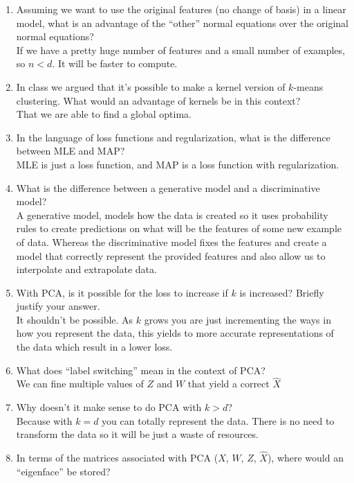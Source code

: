 \documentclass{article}
\def\ans#1{{\color{ans}#1}}
\def\enum#1{\begin{enumerate}#1\end{enumerate}}
\begin{document}
\enum{
\item Assuming we want to use the original features (no change of basis) in a linear model, what is an advantage of the ``other'' normal equations over the original normal equations?  \\
\ans{
    If we have a pretty huge number of features and a small number of examples, so $n < d$. 
    It will be faster to compute.
}
\item In class we argued that it's possible to make a kernel version of $k$-means clustering. What would an advantage of kernels be in this context?  \\
\ans{
    That we are able to find a global optima.
}
\item In the language of loss functions and regularization, what is the difference between MLE and MAP?  \\
\ans{
    MLE is just a loss function, and MAP is a loss function with regularization.
}
\item What is the difference between a generative model and a discriminative model?  \\
\ans{
    A generative model, models how the data is created so it uses probability rules to create predictions 
    on what will be the features of some new example of data. Whereas the discriminative model fixes 
    the features and create a model that correctly represent the provided features and also allow us 
    to interpolate and extrapolate data.
}
\item With PCA, is it possible for the loss to increase if $k$ is increased? Briefly justify your answer.  \\
\ans{
    It shouldn't be possible. As $k$ grows you are just incrementing the ways in how you represent the 
    data, this yields to more accurate representations of the data which result in a lower loss.
}
\item What does ``label switching'' mean in the context of PCA?  \\
\ans{
    We can fine multiple values of $Z$ and $W$ that yield a correct $\hat{X}$
}
\item Why doesn't it make sense to do PCA with $k > d$?  \\
\ans{
    Because with $k = d$ you can totally represent the data. There is no need to transform the data 
    so it will be just a waste of resources.
}
\item In terms of the matrices associated with PCA ($X$, $W$, $Z$, $\hat{X}$), where would an ``eigenface'' be stored?  \\
}
\end{document}
